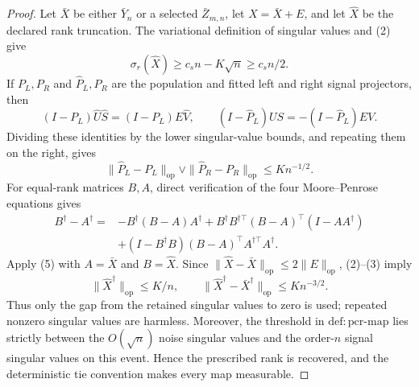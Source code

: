 \documentclass{article}
\begin{document}
\begin{proof}
Let \(\bar X\) be either \(\bar Y_n\) or a selected \(\bar Z_{m,n}\), let \(X=\bar X+E\), and let \(\widehat X\) be the declared rank truncation.  The variational definition of singular values and (2) give
\[
 \sigma_r(\widehat X)\ge c_s n-K\sqrt n\ge c_s n/2.
 \tag{3}
\]
If \(P_L,P_R\) and \(\widehat P_L,\widehat P_R\) are the population and fitted left and right signal projectors, then
\[
 (I-P_L)\widehat U\widehat S=(I-P_L)E\widehat V,\qquad
 (I-\widehat P_L)U S=-(I-\widehat P_L)EV.
\]
Dividing these identities by the lower singular-value bounds, and repeating them on the right, gives
\[
 \|\widehat P_L-P_L\|_{\mathrm{op}}\vee
 \|\widehat P_R-P_R\|_{\mathrm{op}}\le Kn^{-1/2}.
 \tag{4}
\]
For equal-rank matrices \(B,A\), direct verification of the four Moore--Penrose equations gives
\[
\begin{aligned}
 B^\dagger-A^\dagger={}&-B^\dagger(B-A)A^\dagger
 +B^\dagger B^{\dagger\top}(B-A)^\top(I-AA^\dagger)\\
 &+(I-B^\dagger B)(B-A)^\top A^{\dagger\top}A^\dagger .
\end{aligned}
 \tag{5}
\]
Apply (5) with \(A=\bar X\) and \(B=\widehat X\).  Since
\(\|\widehat X-\bar X\|_{\mathrm{op}}\le2\|E\|_{\mathrm{op}}\), (2)--(3) imply
\[
 \|\widehat X^\dagger\|_{\mathrm{op}}\le K/n,\qquad
 \|\widehat X^\dagger-\bar X^\dagger\|_{\mathrm{op}}\le Kn^{-3/2}.
 \tag{6}
\]
Thus only the gap from the retained singular values to zero is used; repeated nonzero singular values are harmless.  Moreover, the threshold in \(\mathrm{def{:}pcr\mbox{-}map}\) lies strictly between the \(O(\sqrt n)\) noise singular values and the order-\(n\) signal singular values on this event.  Hence the prescribed rank is recovered, and the deterministic tie convention makes every map measurable.


\end{proof}
\end{document}
